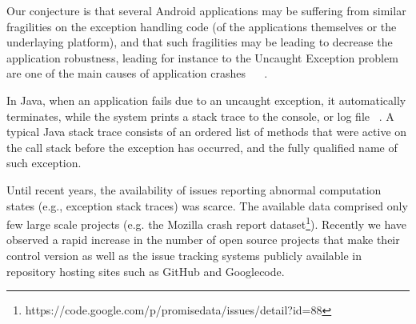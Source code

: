 \documentclass[conference]{IEEEtran}
\begin{document}


Our conjecture is that several Android applications may be suffering from similar 
fragilities on the exception handling code (of the applications themselves or 
the underlaying platform), and that such fragilities may be leading to
decrease the application robustness, leading for instance to the Uncaught Exception problem
 are one of the main causes of application crashes ~\cite{jo2004uncaught} ~\cite{zhang2012amplifying}.


In Java, when an application fails due to an uncaught exception, 
it automatically terminates, while the system prints a stack trace to the console, 
or log file ~\cite{gosling2000java}.  A typical Java stack trace consists of an ordered list of 
methods that were active on the call stack before the exception has occurred,  
 and the fully qualified name of such exception.

Until recent years, the availability of issues reporting abnormal
computation states (e.g., exception stack traces) was scarce. The
available data comprised only few large scale projects (e.g. the Mozilla
crash report dataset\footnote{https://code.google.com/p/promisedata/issues/detail?id=88}).
Recently we have observed a rapid increase in the number of open
source projects that make their control version as well as the issue tracking systems
publicly available in repository hosting sites such as GitHub and Googlecode.


\end{document}
